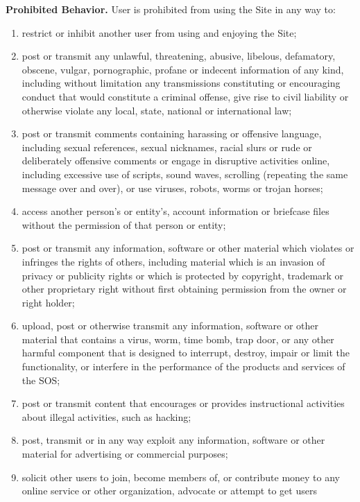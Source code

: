 \textbf{Prohibited Behavior.}
User is prohibited from using the Site in any way to:
\begin{enumerate}[label=]
    \item restrict or inhibit another user from using and enjoying the Site;
    \item post or transmit any unlawful, threatening, abusive, libelous,
    defamatory, obscene, vulgar, pornographic, profane or indecent information
    of any kind, including without limitation any transmissions constituting or
    encouraging conduct that would constitute a criminal offense, give rise to
    civil liability or otherwise violate any local, state, national or
    international law;
    \item post or transmit comments containing harassing or offensive language,
    including sexual references, sexual nicknames, racial slurs or rude or
    deliberately offensive comments or engage in disruptive activities online,
    including excessive use of scripts, sound waves, scrolling (repeating the
    same message over and over), or use viruses, robots, worms or trojan horses;
    \item access another person's or entity's, account information or briefcase
    files without the permission of that person or entity;
    \item post or transmit any information, software or other material which
    violates or infringes the rights of others, including material which is an
    invasion of privacy or publicity rights or which is protected by copyright,
    trademark or other proprietary right without first obtaining permission from
    the owner or right holder;
    \item upload, post or otherwise transmit any information, software or other
    material that contains a virus, worm, time bomb, trap door, or any other
    harmful component that is designed to interrupt, destroy, impair or limit
    the functionality, or interfere in the performance of the products and
    services of the SOS;
    \item post or transmit content that encourages or provides instructional
    activities about illegal activities, such as hacking;
    \item post, transmit or in any way exploit any information, software or
    other material for advertising or commercial purposes;
    \item solicit other users to join, become members of, or contribute money to
    any online service or other organization, advocate or attempt to get users

\end{enumerate}
